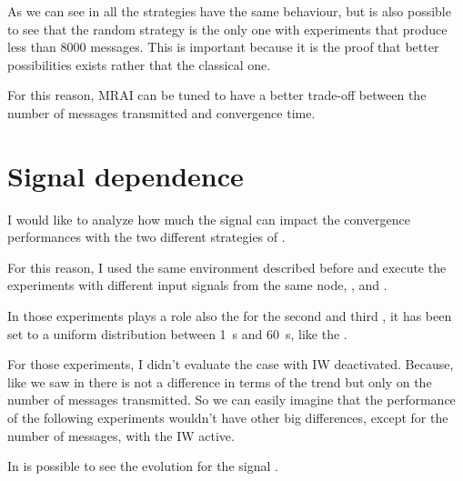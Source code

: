 As we can see in  all the strategies have the same
behaviour, but is also possible to see that the random strategy is the only
one with experiments that produce less than \num{8000} messages.
This is important because it is the proof that better possibilities exists rather
that the classical one.

For this reason, \ac{MRAI} can be tuned to have a better trade-off between
the number of messages transmitted and convergence time.

\section{Signal dependence}
\label{sec:bgp_mrai_signal_dependance}

I would like to analyze how much the signal can impact the convergence performances
with the two different strategies of .

For this reason, I used the same environment described before and execute the
experiments with different input signals from the same node, , 
and .

In those experiments plays a role also the 
for the second and third , it has been set to a uniform distribution
between \SI{1}{\second} and \SI{60}{\second}, like the .

For those experiments, I didn't evaluate the case with \ac{IW} deactivated.
Because, like we saw in
there is not a difference in terms of the trend but only on the number of messages
transmitted.
So we can easily imagine that the performance of the following experiments
wouldn't have other big differences, except for the number of messages, with the
\ac{IW} active.


In  is possible to see the evolution
for the signal .

